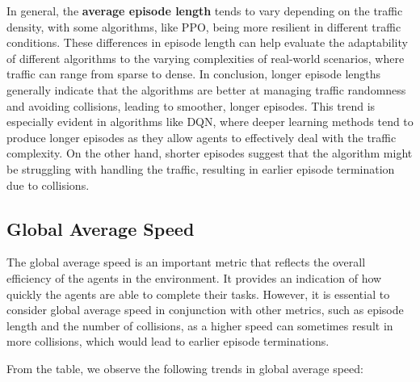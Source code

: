 In general, the \textbf{average episode length} tends to vary depending on the traffic density, with some algorithms, like PPO, being more resilient in different traffic conditions. These differences in episode length can help evaluate the adaptability of different algorithms to the varying complexities of real-world scenarios, where traffic can range from sparse to dense.
In conclusion, longer episode lengths generally indicate that the algorithms are better at managing traffic randomness and avoiding collisions, leading to smoother, longer episodes. This trend is especially evident in algorithms like DQN, where deeper learning methods tend to produce longer episodes as they allow agents to effectively deal with the traffic complexity. On the other hand, shorter episodes suggest that the algorithm might be struggling with handling the traffic, resulting in earlier episode termination due to collisions.

\subsection{Global Average Speed}

The global average speed is an important metric that reflects the overall efficiency of the agents in the environment. It provides an indication of how quickly the agents are able to complete their tasks. However, it is essential to consider global average speed in conjunction with other metrics, such as episode length and the number of collisions, as a higher speed can sometimes result in more collisions, which would lead to earlier episode terminations.

From the table, we observe the following trends in global average speed:

